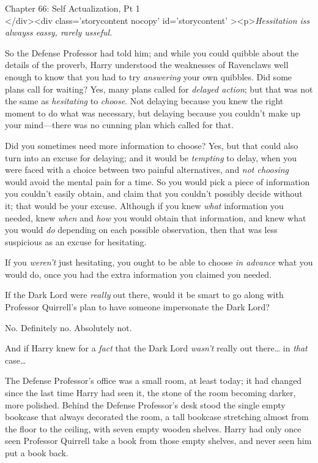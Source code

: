 
Chapter 66: Self Actualization, Pt 1\\
</div><div  class='storycontent nocopy' id='storycontent' ><p>\emph{Hessitation 
iss alwayss eassy, rarely usseful.}

So the Defense Professor had told him; and while you could quibble about the 
details of the proverb, Harry understood the weaknesses of Ravenclaws well 
enough to know that you had to try \emph{answering} your own quibbles. Did some 
plans call for waiting? Yes, many plans called for \emph{delayed action}; but 
that was not the same as \emph{hesitating} to \emph{choose}. Not delaying 
because you knew the right moment to do what was necessary, but delaying 
because you couldn't make up your mind---there was no cunning plan which called 
for that.

Did you sometimes need more information to choose? Yes, but that could also 
turn into an excuse for delaying; and it would be \emph{tempting} to delay, 
when you were faced with a choice between two painful alternatives, and 
\emph{not choosing} would avoid the mental pain for a time. So you would pick a 
piece of information you couldn't easily obtain, and claim that you couldn't 
possibly decide without it; that would be your excuse. Although if you knew 
\emph{what} information you needed, knew \emph{when} and \emph{how} you would 
obtain that information, and knew what you would \emph{do} depending on each 
possible observation, then that was less suspicious as an excuse for hesitating.

If you \emph{weren't} just hesitating, you ought to be able to choose \emph{in 
advance} what you would do, once you had the extra information you claimed you 
needed.

If the Dark Lord were \emph{really} out there, would it be smart to go along 
with Professor Quirrell's plan to have someone impersonate the Dark Lord?

No. Definitely no. Absolutely not.

And if Harry knew for a \emph{fact} that the Dark Lord \emph{wasn't} really out 
there{\ldots} in \emph{that} case{\ldots}

The Defense Professor's office was a small room, at least today; it had changed 
since the last time Harry had seen it, the stone of the room becoming darker, 
more polished. Behind the Defense Professor's desk stood the single empty 
bookcase that always decorated the room, a tall bookcase stretching almost from 
the floor to the ceiling, with seven empty wooden shelves. Harry had only once 
seen Professor Quirrell take a book from those empty shelves, and never seen 
him put a book back.

